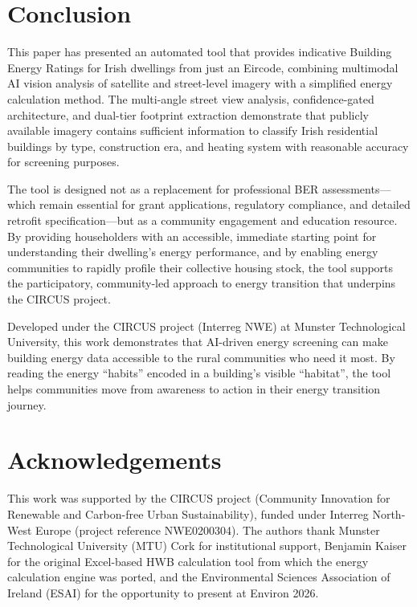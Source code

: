 \documentclass[preprint,12pt,authoryear]{elsarticle}
\begin{document}
\section{Conclusion}
\label{sec:conclusion}

This paper has presented an automated tool that provides indicative Building Energy Ratings for Irish dwellings from just an Eircode, combining multimodal AI vision analysis of satellite and street-level imagery with a simplified energy calculation method. The multi-angle street view analysis, confidence-gated architecture, and dual-tier footprint extraction demonstrate that publicly available imagery contains sufficient information to classify Irish residential buildings by type, construction era, and heating system with reasonable accuracy for screening purposes.

The tool is designed not as a replacement for professional BER assessments---which remain essential for grant applications, regulatory compliance, and detailed retrofit specification---but as a community engagement and education resource. By providing householders with an accessible, immediate starting point for understanding their dwelling's energy performance, and by enabling energy communities to rapidly profile their collective housing stock, the tool supports the participatory, community-led approach to energy transition that underpins the CIRCUS project.

Developed under the CIRCUS project (Interreg NWE) at Munster Technological University, this work demonstrates that AI-driven energy screening can make building energy data accessible to the rural communities who need it most. By reading the energy ``habits'' encoded in a building's visible ``habitat'', the tool helps communities move from awareness to action in their energy transition journey.

\section*{Acknowledgements}

This work was supported by the CIRCUS project (Community Innovation for Renewable and Carbon-free Urban Sustainability), funded under Interreg North-West Europe (project reference NWE0200304). The authors thank Munster Technological University (MTU) Cork for institutional support, Benjamin Kaiser for the original Excel-based HWB calculation tool from which the energy calculation engine was ported, and the Environmental Sciences Association of Ireland (ESAI) for the opportunity to present at Environ 2026.



\end{document}
